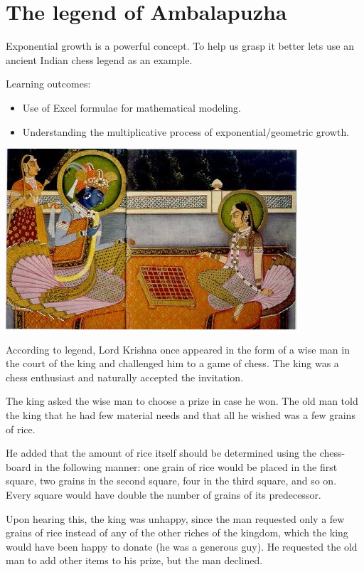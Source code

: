\documentclass[
  a4paper]{book}
\providecommand{\tightlist}{%
  \setlength{\itemsep}{0pt}\setlength{\parskip}{0pt}}
\begin{document}
\hypertarget{the-legend-of-ambalapuzha}{%
\chapter{The legend of Ambalapuzha}\label{the-legend-of-ambalapuzha}}

Exponential growth is a powerful concept. To help us grasp it better lets use an ancient Indian chess legend as an example.

\begin{do-something}
Learning outcomes:

\begin{itemize}
\tightlist
\item
  Use of Excel formulae for mathematical modeling.
\item
  Understanding the multiplicative process of exponential/geometric
  growth.
\end{itemize}
\end{do-something}

\begin{center}\includegraphics[width=0.5\linewidth]{images/Radha-Krishna_chess} \end{center}

According to legend, Lord Krishna once appeared in the form of a wise man in the court of the king and challenged him to a game of chess. The king was a chess enthusiast and naturally accepted the invitation.

The king asked the wise man to choose a prize in case he won. The old man told the king that he had few material needs and that all he wished was a few grains of rice.

He added that the amount of rice itself should be determined using the chess- board in the following manner: one grain of rice would be placed in the first square, two grains in the second square, four in the third square, and so on. Every square would have double the number of grains of its predecessor.

Upon hearing this, the king was unhappy, since the man requested only a few grains of rice instead of any of the other riches of the kingdom, which the king would have been happy to donate (he was a generous guy). He requested the old man to add other items to his prize, but the man declined.
\end{document}
